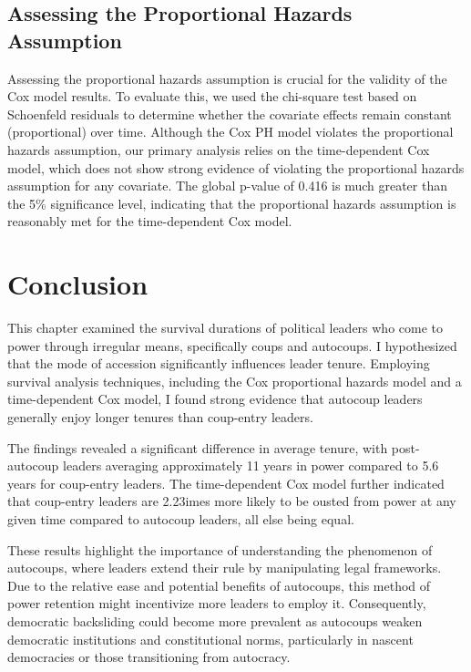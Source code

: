 \documentclass[
  12pt,
]{report}
\begin{document}
\subsection{Assessing the Proportional Hazards
Assumption}\label{assessing-the-proportional-hazards-assumption}

Assessing the proportional hazards assumption is crucial for the
validity of the Cox model results. To evaluate this, we used the
chi-square test based on Schoenfeld residuals to determine whether the
covariate effects remain constant (proportional) over time. Although the
Cox PH model violates the proportional hazards assumption, our primary
analysis relies on the time-dependent Cox model, which does not show
strong evidence of violating the proportional hazards assumption for any
covariate. The global p-value of 0.416 is much greater than the 5\%
significance level, indicating that the proportional hazards assumption
is reasonably met for the time-dependent Cox model.

\section{Conclusion}\label{conclusion-2}

This chapter examined the survival durations of political leaders who
come to power through irregular means, specifically coups and autocoups.
I hypothesized that the mode of accession significantly influences
leader tenure. Employing survival analysis techniques, including the Cox
proportional hazards model and a time-dependent Cox model, I found
strong evidence that autocoup leaders generally enjoy longer tenures
than coup-entry leaders.

The findings revealed a significant difference in average tenure, with
post-autocoup leaders averaging approximately 11 years in power compared
to 5.6 years for coup-entry leaders. The time-dependent Cox model
further indicated that coup-entry leaders are 2.23imes more likely to be
ousted from power at any given time compared to autocoup leaders, all
else being equal.

These results highlight the importance of understanding the phenomenon
of autocoups, where leaders extend their rule by manipulating legal
frameworks. Due to the relative ease and potential benefits of
autocoups, this method of power retention might incentivize more leaders
to employ it. Consequently, democratic backsliding could become more
prevalent as autocoups weaken democratic institutions and constitutional
norms, particularly in nascent democracies or those transitioning from
autocracy.
\end{document}
